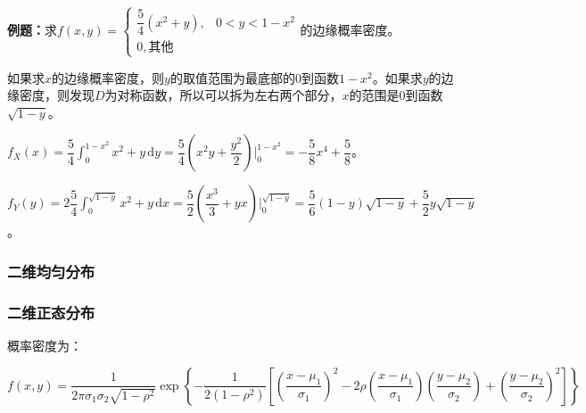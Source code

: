 \textbf{例题：}求$f(x,y)=\left\{\begin{array}{ll}
    \dfrac{5}{4}(x^2+y), & 0<y<1-x^2 \\
    0, \text{其他}
\end{array}\right.$的边缘概率密度。

\begin{minipage}{0.5\linewidth}
    
    如果求$x$的边缘概率密度，则$y$的取值范围为最底部的0到函数$1-x^2$。如果求$y$的边缘密度，则发现$D$为对称函数，所以可以拆为左右两个部分，$x$的范围是$0$到函数$\sqrt{1-y}$。

\end{minipage}
\hfill
\begin{minipage}{0.4\linewidth}
\end{minipage}

$f_X(x)=\dfrac{5}{4}\int_0^{1-x^2}x^2+y\,\textrm{d}y=\dfrac{5}{4}\left(x^2y+\dfrac{y^2}{2}\right)\bigg\vert_0^{1-x^2}=-\dfrac{5}{8}x^4+\dfrac{5}{8}$。

$f_Y(y)=2\dfrac{5}{4}\int_0^{\sqrt{1-y}}x^2+y\,\textrm{d}x=\dfrac{5}{2}\left(\dfrac{x^3}{3}+yx\right)\bigg\vert_0^{\sqrt{1-y}}=\dfrac{5}{6}(1-y)\sqrt{1-y}+\dfrac{5}{2}y\sqrt{1-y}$。

\subsubsection{二维均匀分布}

\subsubsection{二维正态分布}

概率密度为：

{\fontsize{8.2pt}{10pt}$f(x,y)=\dfrac{1}{2\pi\sigma_1\sigma_2\sqrt{1-\rho^2}}\exp\left\{-\dfrac{1}{2(1-\rho^2)}\left[\left(\dfrac{x-\mu_1}{\sigma_1}\right)^2-2\rho\left(\dfrac{x-\mu_1}{\sigma_1}\right)\left(\dfrac{y-\mu_2}{\sigma_2}\right)+\left(\dfrac{y-\mu_2}{\sigma_2}\right)^2\right]\right\}$}

